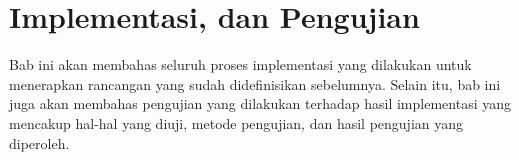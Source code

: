 \chapter{Implementasi, dan Pengujian}

Bab ini akan membahas seluruh proses implementasi yang dilakukan untuk menerapkan rancangan yang sudah didefinisikan sebelumnya. Selain itu, bab ini juga akan membahas pengujian yang dilakukan terhadap hasil implementasi yang mencakup hal-hal yang diuji, metode pengujian, dan hasil pengujian yang diperoleh. 

%
%
%
